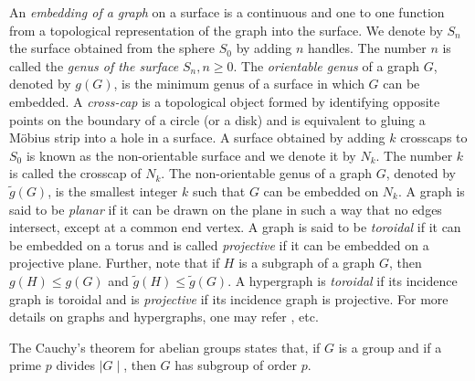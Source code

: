 \documentclass[11pt,a4paper]{article}
\theoremstyle{definition}
\theoremstyle{remark}
\begin{document}
	
	
	An \textit{embedding of a graph} on a surface is a continuous and  one to one
	function from a topological representation of the graph into the surface. We denote by $S_n$ the surface obtained from the sphere $S_0$  by adding $n$ handles. The number $n$ is called the \textit{genus of the surface} $S_n, n\geq 0$.  The \textit{orientable genus} of a graph $G$, denoted by $g(G)$, is the minimum genus of
	a surface in which $G$ can be embedded.  A \textit{cross-cap} is a topological object formed by identifying opposite points on the boundary of a circle (or a disk) and is equivalent to gluing a Möbius strip into a hole in a surface. A surface obtained by adding $k$ crosscaps to $S_0$ 
	is known as the non-orientable surface and we denote it by $N_k$. The number $k$ is called the crosscap of $N_k$. The non-orientable genus of
	a graph $G$, denoted by $\tilde{g}(G)$, is the smallest integer $k$ such that $G$ can be embedded on $N_k$.  A graph is said to be \textit{planar} if it can be drawn on the plane in such a way that no edges intersect, except at a common end vertex.  A graph is said to be \textit{toroidal} if it  can be embedded on a torus and is called \textit{projective} if it can be embedded on a projective plane.   Further, note that if $H$ is a subgraph of a graph $G$, then $g(H) \leq g(G)$ and $\tilde{g}(H) \leq \tilde{g}(G)$. A hypergraph is \textit{toroidal} if its incidence graph is toroidal and is  \textit{projective} if its incidence graph is projective. For more details on graphs and hypergraphs, one may refer \cite{voloshinhypergraphs,white1985graphs}, etc.
	
	The Cauchy's theorem for abelian groups states that, if $G$ is a group and if a prime $p$ divides $\mid G \mid$, then $G$ has subgroup of order $p$.
\end{document}
